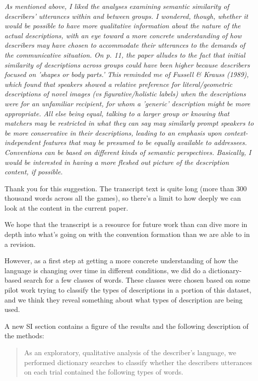 \documentclass{stanfordletter}
\newcommand{\theysaid}[1]{\begin{leftbar} \noindent 
		\textsl{ #1}\end{leftbar}}
\newcommand{\revised}[1]{\begin{quote}	#1 \end{quote}}
\begin{document}
\begin{letter}{}
          
          \theysaid{As mentioned above, I liked the analyses examining semantic similarity of describers' utterances within and between groups. I wondered, though, whether it would be possible to have more qualitative information about the nature of the actual descriptions, with an eye toward a more concrete understanding of how describers may have chosen to accommodate their utterances to the demands of the communicative situation. On p. 11, the paper alludes to the fact that initial similarity of descriptions across groups could have been higher because describers focused on 'shapes or body parts.' This reminded me of Fussell \& Krauss (1989), which found that speakers showed a relative preference for literal/geometric descriptions of novel images (vs figurative/holistic labels) when the descriptions were for an unfamiliar recipient, for whom a 'generic' description might be more appropriate. All else being equal, talking to a larger group or knowing that matchers may be restricted in what they can say may similarly prompt speakers to be more conservative in their descriptions, leading to an emphasis upon context-independent features that may be presumed to be equally available to addressees. Conventions can be based on different kinds of semantic perspectives. Basically, I would be interested in having a more fleshed out picture of the description content, if possible.}


          Thank you for this suggestion. The transcript text is quite long (more than 300 thousand words across all the games), so there's a limit to how deeply we can look at the content in the current paper. 
          
          We hope that the transcript is a resource for future work than can dive more in depth into what's going on with the convention formation than we are able to in a revision. 
          
          However, as a first step at getting a more concrete understanding of how the language is changing over time in different conditions, we did do a dictionary-based search for a few classes of words. These classes were chosen based on some pilot work trying to classify the types of descriptions in a portion of this dataset, and we think they reveal something about what types of description are being used. 
          
                    A new SI section contains a figure of the results and the following description of the methods:
          
          \revised{As an exploratory, qualitative analysis of the describer's language, we performed dictionary searches to classify whether the describers utterances on each trial contained the following types of words. 
          	
}
\end{letter}
\end{document}
